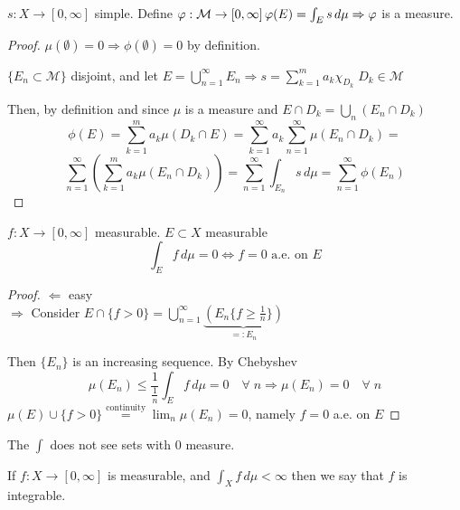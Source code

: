 \begin{theorem}
    \(s : X \to \left[0, \infty\right]\) simple. Define \(\phi : \mathcal{M} \to \left[0, \infty\right] \\ \phi(E) = \int_E s \, d\mu \\ \Rightarrow \phi \) is a measure. 
\end{theorem}

\begin{proof}
    \(\mu(\emptyset) =0 \Rightarrow \phi(\emptyset)=0 \) by definition. 
    \begin{definition}
        \(\{E_n \subset \mathcal{M}\}\) disjoint, and let \(E = \bigcup_{n=1}^\infty E_n \Rightarrow s = \sum_{k=1}^m a_k \chi_{D_k} \; D_k \in \mathcal{M}
        \)
    \end{definition}
    Then, by definition and since \(\mu\) is a measure and \(E \cap D_k = \bigcup_n (E_n \cap D_k)  \) 
    \[
        \phi(E) = \sum_{k=1}^m a_k \mu(D_k \cap E) = 
        \sum_{k=1}^\infty a_k \sum_{n=1}^\infty \mu(E_n \cap D_k)= 
    \]
    \[    
        \sum_{n=1}^\infty \left( \sum_{k=1}^m a_k \mu (E_n \cap D_k) \right) = 
        \sum_{n=1}^\infty \int_{E_n} s \, d\mu = 
        \sum_{n=1}^\infty \phi(E_n)
    \]
\end{proof}

\begin{theorem}
    \(f: X \to \left[0, \infty\right]\) measurable. \(E \subset X \) measurable 
    \[\int_E f \, d\mu =0 \Leftrightarrow f=0 \text{ a.e. on } E \]
\end{theorem}
\begin{proof}
    \( \Leftarrow \) easy \\
    \( \Rightarrow \) Consider \( E \cap \{f >0\} = \bigcup_{n=1}^\infty \underbrace{\left(E_n \{ f \geq \frac{1}{n} \} \right)}_{=:E_n} \) 
    
    Then \(\{E_n\}\) is an increasing sequence. By Chebyshev 
    \[
        \mu (E_n) \leq \frac{1}{\frac{1}{n}} \int_E f \, d\mu =0 \quad \forall \; n \Rightarrow \mu(E_n)=0 \quad \forall \; n 
    \]
    \(\mu(E) \cup \{f>0\} \overset{\text{continuity}}{=} \lim_n \mu (E_n)=0\), namely \(f=0\) a.e. on \(E\)
\end{proof}

The \(\int\) does not see sets with 0 measure.

\begin{definition}
    If \( f:X \to \left[0, \infty\right] \) is measurable, and \( \int_X f \, d\mu < \infty \) then we say that \(f\) is integrable.
\end{definition}


